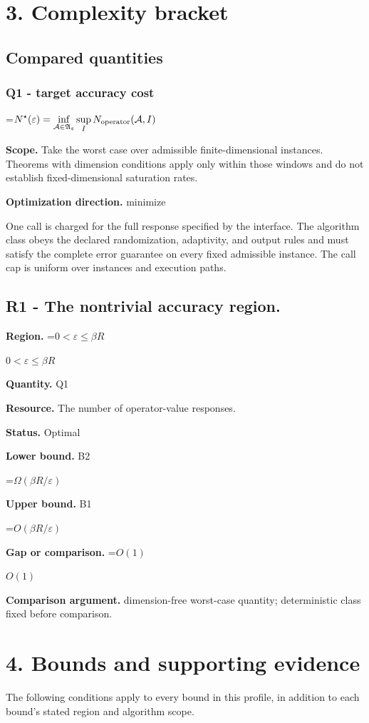 \documentclass[10pt,a4paper]{article}
\newcommand{\AtlasMath}[1]{\par\begingroup\centering\setbox0=\hbox{$\displaystyle #1$}\ifdim\wd0>1.4\linewidth\typeout{ATLAS WIDE FORMULA: \the\wd0}\fi\ifdim\wd0>\linewidth\resizebox{\linewidth}{!}{\box0}\else\box0\fi\par\endgroup}
\newcommand{\AtlasInlineMath}[1]{\begingroup\setbox0=\hbox{$#1$}\ifdim\wd0>.4\linewidth\endgroup\AtlasMath{#1}\else\endgroup$#1$\fi}
\begin{document}
\section{3. Complexity bracket}
\subsection{Compared quantities}
\subsubsection{Q1 - target accuracy cost}
\AtlasMath{N^\star(\varepsilon)=\inf_{\mathcal A\in\mathfrak A_\varepsilon}\sup_I N_{\rm operator}(\mathcal A,I)}
\textbf{Scope.} Take the worst case over admissible finite-dimensional instances. Theorems with dimension conditions apply only within those windows and do not establish fixed-dimensional saturation rates.

\textbf{Optimization direction.} minimize

One call is charged for the full response specified by the interface. The algorithm class obeys the declared randomization, adaptivity, and output rules and must satisfy the complete error guarantee on every fixed admissible instance. The call cap is uniform over instances and execution paths.

\subsection{R1 - The nontrivial accuracy region.}
\textbf{Region.} \AtlasInlineMath{0<\varepsilon\le\beta R}

\textbf{Quantity.} Q1

\textbf{Resource.} The number of operator-value responses.

\textbf{Status.} Optimal

\textbf{Lower bound.} B2

\AtlasMath{\Omega(\beta R/\varepsilon)}
\textbf{Upper bound.} B1

\AtlasMath{O(\beta R/\varepsilon)}
\textbf{Gap or comparison.} \AtlasInlineMath{O(1)}

\textbf{Comparison argument.} dimension-free worst-case quantity; deterministic class fixed before comparison.

\section{4. Bounds and supporting evidence}
The following conditions apply to every bound in this profile, in addition to each bound's stated region and algorithm scope.
\end{document}

